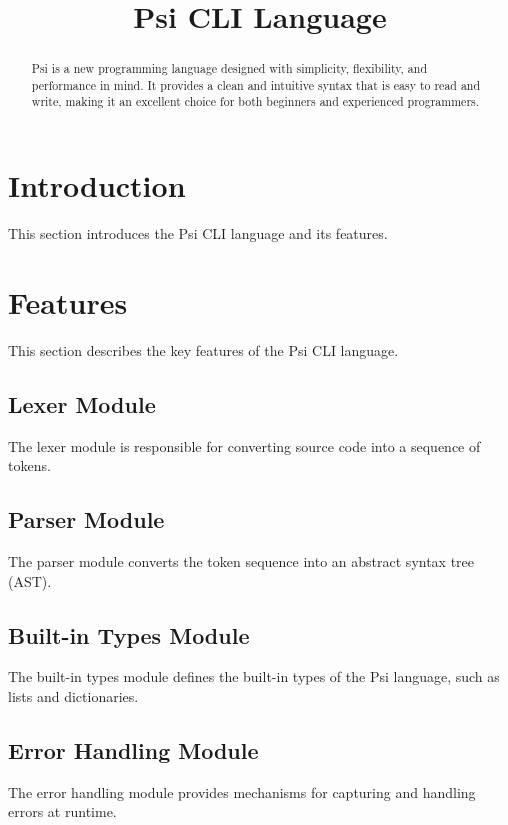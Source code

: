 \documentclass[conference]{IEEEtran}
\begin{document}
\title{Psi CLI Language}
\author{
}
\maketitle

\begin{abstract}
    Psi is a new programming language designed with simplicity, flexibility, and performance in mind. It provides a clean and intuitive syntax that is easy to read and write, making it an excellent choice for both beginners and experienced programmers.
\end{abstract}

\section{Introduction}
This section introduces the Psi CLI language and its features.

\section{Features}
This section describes the key features of the Psi CLI language.

\subsection{Lexer Module}
The lexer module is responsible for converting source code into a sequence of tokens.

\subsection{Parser Module}
The parser module converts the token sequence into an abstract syntax tree (AST).

\subsection{Built-in Types Module}
The built-in types module defines the built-in types of the Psi language, such as lists and dictionaries.

\subsection{Error Handling Module}
The error handling module provides mechanisms for capturing and handling errors at runtime.
\end{document}
